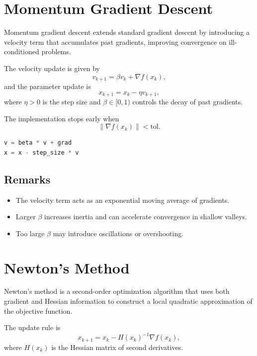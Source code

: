 \documentclass[12pt,a4paper]{report}
\begin{document}
\section{Momentum Gradient Descent}

Momentum gradient descent extends standard gradient descent by introducing a velocity term that accumulates past gradients, improving convergence on ill-conditioned problems.

The velocity update is given by
\begin{equation}
v_{k+1} = \beta v_k + \nabla f(x_k),
\end{equation}
and the parameter update is
\begin{equation}
x_{k+1} = x_k - \eta v_{k+1},
\end{equation}
where $\eta > 0$ is the step size and $\beta \in [0,1)$ controls the decay of past gradients.

The implementation stops early when
\begin{equation}
\|\nabla f(x_k)\| < \text{tol}.
\end{equation}

\begin{lstlisting}[language=Python]
v = beta * v + grad
x = x - step_size * v
\end{lstlisting}

\subsection*{Remarks}
\begin{itemize}
    \item The velocity term acts as an exponential moving average of gradients.
    \item Larger $\beta$ increases inertia and can accelerate convergence in shallow valleys.
    \item Too large $\beta$ may introduce oscillations or overshooting.
\end{itemize}

\section{Newton's Method}

Newton's method is a second-order optimization algorithm that uses both gradient and Hessian information to construct a local quadratic approximation of the objective function.

The update rule is
\begin{equation}
x_{k+1} = x_k - H(x_k)^{-1}\nabla f(x_k),
\end{equation}
where $H(x_k)$ is the Hessian matrix of second derivatives.
\end{document}
